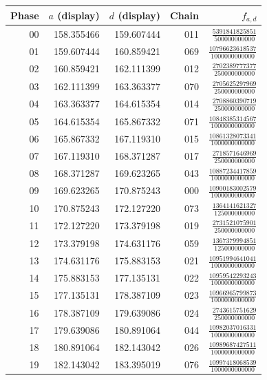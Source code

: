 \begin{longtable}{@{}rrrrr@{}}
\toprule Phase & $a$ (display) & $d$ (display) & Chain & $f_{a,d}$\\\midrule\endhead
00 & 158.355466 & 159.607444 & 011 & $\frac{5391841825851}{500000000000}$\\[3pt]
01 & 159.607444 & 160.859421 & 069 & $\frac{10796623618537}{1000000000000}$\\[3pt]
02 & 160.859421 & 162.111399 & 012 & $\frac{2702389777377}{250000000000}$\\[3pt]
03 & 162.111399 & 163.363377 & 070 & $\frac{2705625297969}{250000000000}$\\[3pt]
04 & 163.363377 & 164.615354 & 014 & $\frac{2708860390719}{250000000000}$\\[3pt]
05 & 164.615354 & 165.867332 & 071 & $\frac{10848385314567}{1000000000000}$\\[3pt]
06 & 165.867332 & 167.119310 & 015 & $\frac{10861328073341}{1000000000000}$\\[3pt]
07 & 167.119310 & 168.371287 & 017 & $\frac{2718571646969}{250000000000}$\\[3pt]
08 & 168.371287 & 169.623265 & 043 & $\frac{10887234417859}{1000000000000}$\\[3pt]
09 & 169.623265 & 170.875243 & 000 & $\frac{10900183002579}{1000000000000}$\\[3pt]
10 & 170.875243 & 172.127220 & 073 & $\frac{1364141621327}{125000000000}$\\[3pt]
11 & 172.127220 & 173.379198 & 019 & $\frac{2731521075901}{250000000000}$\\[3pt]
12 & 173.379198 & 174.631176 & 059 & $\frac{1367379994851}{125000000000}$\\[3pt]
13 & 174.631176 & 175.883153 & 021 & $\frac{10951994641041}{1000000000000}$\\[3pt]
14 & 175.883153 & 177.135131 & 022 & $\frac{10959542293243}{1000000000000}$\\[3pt]
15 & 177.135131 & 178.387109 & 023 & $\frac{10966965799873}{1000000000000}$\\[3pt]
16 & 178.387109 & 179.639086 & 024 & $\frac{2743615751629}{250000000000}$\\[3pt]
17 & 179.639086 & 180.891064 & 044 & $\frac{10982037016331}{1000000000000}$\\[3pt]
18 & 180.891064 & 182.143042 & 026 & $\frac{10989687427511}{1000000000000}$\\[3pt]
19 & 182.143042 & 183.395019 & 076 & $\frac{10997418068539}{1000000000000}$\\[3pt]

\end{longtable}
